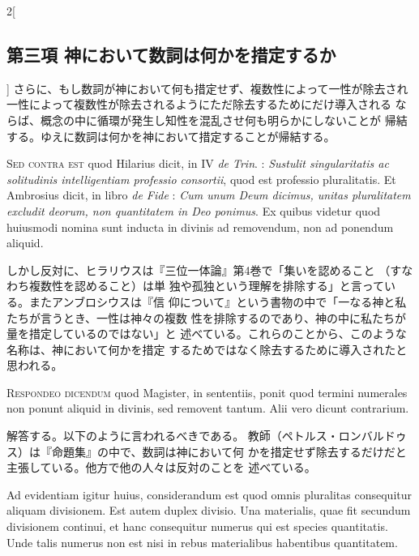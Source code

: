 \documentclass[paper=a4paper,fontsize=10pt,jafontsize=9pt,titlepage]{jlreq}
\begin{document}
\begin{paracol}{2}[\subsection{第三項 神において数詞は何かを措定するか}]
さらに、もし数詞が神において何も措定せず、複数性によって一性が除去され
 一性によって複数性が除去されるようにただ除去するためにだけ導入される
 ならば、概念の中に循環が発生し知性を混乱させ何も明らかにしないことが
 帰結する。ゆえに数詞は何かを神において措定することが帰結する。


\switchcolumn*[\subsection{s.c.}]


{\scshape Sed contra est} quod Hilarius dicit, in IV {\itshape de
 Trin}. : {\itshape Sustulit
singularitatis ac solitudinis intelligentiam professio consortii}, quod
est professio pluralitatis. Et Ambrosius dicit, in libro {\itshape de
 Fide} : {\itshape Cum
unum Deum dicimus, unitas pluralitatem excludit deorum, non
quantitatem in Deo ponimus}. Ex quibus videtur quod huiusmodi nomina
sunt inducta in divinis ad removendum, non ad ponendum aliquid.


\switchcolumn


しかし反対に、ヒラリウスは『三位一体論』第4巻で「集いを認めること
 （すなわち複数性を認めること）は単
 独や孤独という理解を排除する」と言っている。またアンブロシウスは『信
 仰について』という書物の中で「一なる神と私たちが言うとき、一性は神々の複数
 性を排除するのであり、神の中に私たちが量を措定しているのではない」と
 述べている。これらのことから、このような名称は、神において何かを措定
 するためではなく除去するために導入されたと思われる。




{\scshape Respondeo dicendum} quod Magister, in sententiis, ponit quod termini
numerales non ponunt aliquid in divinis, sed removent tantum. Alii
vero dicunt contrarium.


\switchcolumn


解答する。以下のように言われるべきである。
教師（ペトルス・ロンバルドゥス）は『命題集』の中で、数詞は神において何
 かを措定せず除去するだけだと主張している。他方で他の人々は反対のことを
 述べている。


\switchcolumn*


Ad evidentiam igitur huius, considerandum est
quod omnis pluralitas consequitur aliquam divisionem. 
Est autem duplex
divisio. Una materialis, quae fit secundum divisionem continui, et
hanc consequitur numerus qui est species quantitatis. Unde talis
numerus non est nisi in rebus materialibus habentibus
quantitatem.



\end{paracol}
\end{document}
